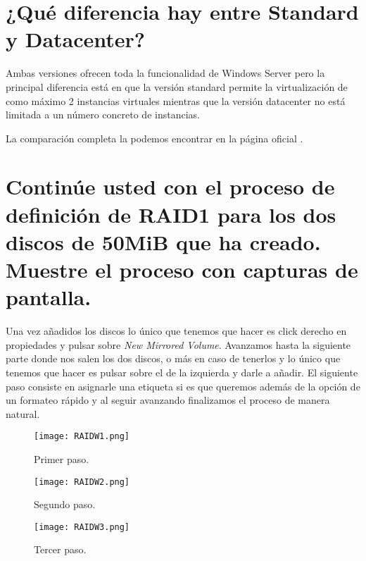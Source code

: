 \section{¿Qué diferencia hay entre Standard y Datacenter?}
Ambas versiones ofrecen toda la funcionalidad de Windows Server pero la principal diferencia está en que la versión standard permite la virtualización de como máximo 2 instancias virtuales mientras que la versión datacenter no está limitada a un número concreto de instancias.

La comparación completa la podemos encontrar en la página oficial \cite{windows_std_data}.



\section{Continúe usted con el proceso de definición de RAID1 para los dos discos de 50MiB que ha creado. Muestre el proceso con capturas de pantalla.}

Una vez añadidos los discos lo único que tenemos que hacer es click derecho en propiedades y pulsar sobre \textit{New Mirrored Volume}. Avanzamos hasta la siguiente parte donde nos salen los dos discos, o más en caso de tenerlos y lo único que tenemos que hacer es pulsar sobre el de la izquierda y darle a añadir. El siguiente paso consiste en asignarle una etiqueta si es que queremos además de la opción de un formateo rápido y al seguir avanzando finalizamos el proceso de manera natural.

\begin{figure}[H]
	\centering
	\texttt{[image: RAIDW1.png]}
	\caption{Primer paso. \label{fig:figura5}}
\end{figure}

\begin{figure}[H]
	\centering
	\texttt{[image: RAIDW2.png]}
	\caption{Segundo paso. \label{fig:figura6}}
\end{figure}

\begin{figure}[H]
	\centering
	\texttt{[image: RAIDW3.png]}
	\caption{Tercer paso. \label{fig:figura7}}
\end{figure}

